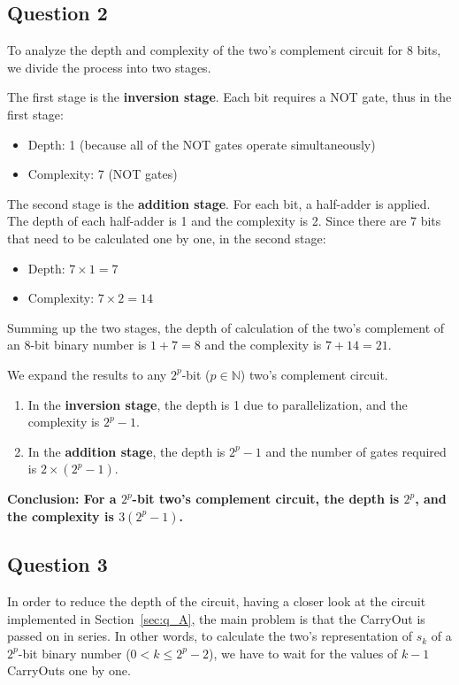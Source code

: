 \documentclass[conference]{IEEEtran}
\begin{document}
\subsection{Question 2}

To analyze the depth and complexity of the two's complement circuit for 8 bits, we divide the process into two stages.

The first stage is the \textbf{inversion stage}. Each bit requires a NOT gate, thus in the first stage:
\begin{itemize}
\item Depth: 1 (because all of the NOT gates operate simultaneously)
\item Complexity: 7 (NOT gates)
\end{itemize}

The second stage is the \textbf{addition stage}. For each bit, a half-adder is applied.
The depth of each half-adder is 1 and the complexity is 2. Since there are 7 bits that need to be calculated one by one, in the second stage:
\begin{itemize}
    \item Depth: $7 \times 1 = 7$
    \item Complexity: $7 \times 2 = 14$
\end{itemize}

Summing up the two stages, the depth of calculation of the two's complement of an 8-bit binary number is $1 + 7 = 8$ and the complexity is $7 + 14 = 21$.

We expand the results to any $2^p$-bit ($p \in \mathbb{N}$) two's complement circuit.

\begin{enumerate}
\item In the \textbf{inversion stage}, the depth is 1 due to parallelization, and the complexity is $2^p - 1$.
\item In the \textbf{addition stage}, the depth is $2^p - 1$ and the number of gates required is $2 \times (2^p - 1)$.
\end{enumerate}

\textbf{
Conclusion: For a $2^p$-bit two's complement circuit, the depth is $2^p$, and the complexity is $3(2^p - 1)$.
}

\subsection{Question 3}

In order to reduce the depth of the circuit, having a closer look at the circuit implemented in Section~\ref{sec:q_A}, the main problem is that the CarryOut is passed on in series.
In other words, to calculate the two's representation of $s_k$ of a $2^p$-bit binary number ($0 < k \leq 2^p-2$), we have to wait for the values of $k-1$ CarryOuts one by one.
\end{document}
